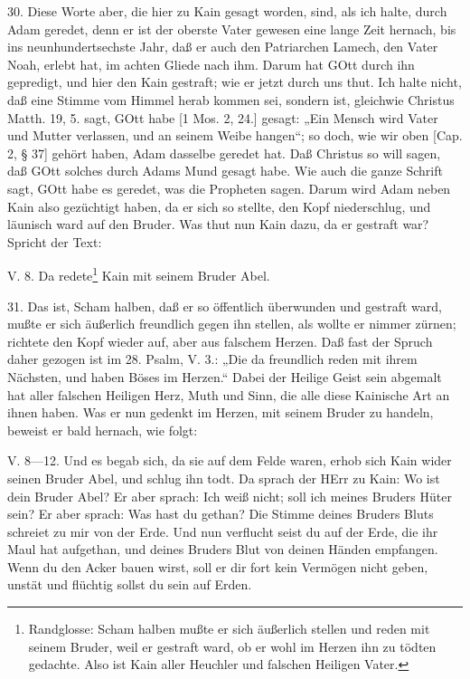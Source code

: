 30. Diese Worte aber, die hier zu Kain gesagt worden, sind, als ich halte, durch Adam geredet, denn er ist der oberste Vater gewesen eine lange Zeit hernach, bis ins neunhundertsechste Jahr, daß er auch den Patriarchen Lamech, den Vater Noah, erlebt hat, im achten Gliede nach ihm. Darum hat GOtt durch ihn gepredigt, und hier den Kain gestraft; wie er jetzt durch uns thut. Ich halte nicht, daß eine Stimme vom Himmel herab kommen sei, sondern ist, gleichwie Christus Matth. 19, 5. sagt, GOtt habe [1 Mos. 2, 24.] gesagt: „Ein Mensch wird Vater und Mutter verlassen, und an seinem Weibe hangen“; so doch, wie wir oben [Cap. 2, § 37] gehört haben, Adam dasselbe geredet hat. Daß Christus so will sagen, daß GOtt solches durch Adams Mund gesagt habe. Wie auch die ganze Schrift sagt, GOtt habe es geredet, was die Propheten sagen. Darum wird Adam neben Kain also gezüchtigt haben, da er sich so stellte, den Kopf niederschlug, und läunisch ward auf den Bruder. Was thut nun Kain dazu, da er gestraft war? Spricht der Text:

\begin{schriftzitat}
V. 8. Da redete\footnote{Randglosse: Scham halben mußte er sich äußerlich stellen und reden mit seinem Bruder, weil er gestraft ward, ob er wohl im Herzen ihn zu tödten gedachte. Also ist Kain aller Heuchler und falschen Heiligen Vater.} Kain mit seinem Bruder Abel.
\end{schriftzitat}

31. Das ist, Scham halben, daß er so öffentlich überwunden und gestraft ward, mußte er sich äußerlich freundlich gegen ihn stellen, als wollte er nimmer zürnen; richtete den Kopf wieder auf, aber aus falschem Herzen. Daß fast der Spruch daher gezogen ist im 28. Psalm, V. 3.: „Die da freundlich reden mit ihrem Nächsten, und haben Böses im Herzen.“ Dabei der Heilige Geist sein abgemalt hat aller falschen Heiligen Herz, Muth und Sinn, die alle diese Kainische Art an ihnen haben. Was er nun gedenkt im Herzen, mit seinem Bruder zu handeln, beweist er bald hernach, wie folgt:

\begin{schriftzitat}
V. 8—12. Und es begab sich, da sie auf dem Felde waren, erhob sich Kain wider seinen Bruder Abel, und schlug ihn todt. Da sprach der HErr zu Kain: Wo ist dein Bruder Abel? Er aber sprach: Ich weiß nicht; soll ich meines Bruders Hüter sein? Er aber sprach: Was hast du gethan? Die Stimme deines Bruders Bluts schreiet zu mir von der Erde. Und nun verflucht seist du auf der Erde, die ihr Maul hat aufgethan, und deines Bruders Blut von deinen Händen empfangen. Wenn du den Acker bauen wirst, soll er dir fort kein Vermögen nicht geben, unstät und flüchtig sollst du sein auf Erden.
\end{schriftzitat}

